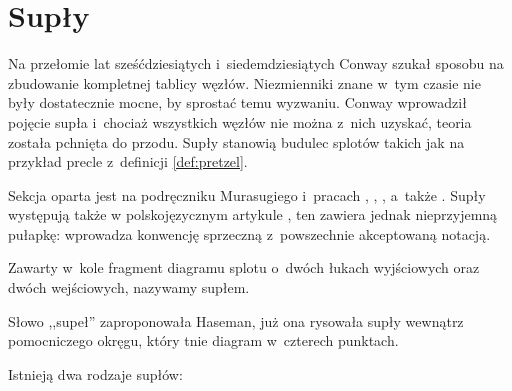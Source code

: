 
\section{Supły}
\label{sec:tangle}
Na przełomie lat sześćdziesiątych i~siedemdziesiątych Conway szukał sposobu na zbudowanie kompletnej tablicy węzłów.
Niezmienniki znane w~tym czasie nie były dostatecznie mocne, by sprostać temu wyzwaniu.
Conway wprowadził pojęcie supła i~chociaż wszystkich węzłów nie można z~nich uzyskać, teoria została pchnięta do przodu.
Supły stanowią budulec splotów takich jak na przykład precle z~definicji \ref{def:pretzel}.

Sekcja oparta jest na podręczniku Murasugiego \cite{murasugi96} i~pracach \cite{conway70}, \cite{kauffman97}, \cite{kauffman04}, a~także \cite{schubert56}.
%
%
%
%
%
Supły występują także w polskojęzycznym artykule \cite{janiak04}, ten zawiera jednak nieprzyjemną pułapkę: wprowadza konwencję sprzeczną z~powszechnie akceptowaną notacją.
%
%

\begin{definition}[supeł]
    \label{def:tangle}
    Zawarty w~kole fragment diagramu splotu o~dwóch łukach wyjściowych oraz dwóch wejściowych, nazywamy supłem.
\end{definition}

Słowo ,,supeł'' zaproponowała Haseman, już ona rysowała supły wewnątrz pomocniczego okręgu, który tnie diagram w~czterech punktach.
%

Istnieją dwa rodzaje supłów:
\begin{comment}
\begin{figure}[H]
    \centering
    \begin{minipage}[b]{.48\linewidth}
        \[\LargeTangleAlternatingYes\]
        \subcaption{supeł naprzemienny}
    \end{minipage}
    \begin{minipage}[b]{.48\linewidth}
        \centering
        \[\LargeTangleAlternatingNo\]
        \subcaption{supeł sąsiądujący}
    \end{minipage}
\end{figure}
\end{comment}

